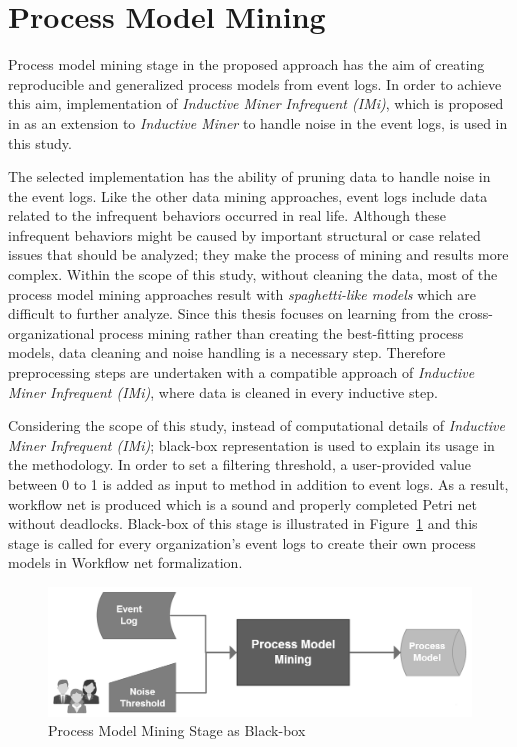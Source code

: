 \section{Process Model Mining}
\label{sec:process-model-mining}
Process model mining stage in the proposed approach has the aim of creating reproducible and generalized process models from event logs. In order to achieve this aim, implementation of \textit{Inductive Miner Infrequent (IMi)}, which is proposed in \cite{leemans2014discoveringinfrequent} as an extension to \textit{Inductive Miner} to handle noise in the event logs, is used in this study. 

The selected implementation has the ability of pruning data to handle noise in the event logs. Like the other data mining approaches, event logs include data related to the infrequent behaviors occurred in real life. Although these infrequent behaviors might be caused by important structural or case related issues that should be analyzed; they make the process of mining and results more complex. Within the scope of this study, without cleaning the data, most of the process model mining approaches result with \textit{spaghetti-like models} \cite{van2011process} which are difficult to further analyze. Since this thesis focuses on learning from the cross-organizational process mining rather than creating the best-fitting process models, data cleaning and noise handling is a necessary step. Therefore preprocessing steps are undertaken with a compatible approach of \textit{Inductive Miner Infrequent (IMi)}, where data is cleaned in every inductive step.

Considering the scope of this study, instead of computational details of \textit{Inductive Miner Infrequent (IMi)}; black-box representation is used to explain its usage in the methodology. In order to set a filtering threshold, a user-provided value between 0 to 1 is added as input to method in addition to event logs. As a result, workflow net is produced which is a sound and properly completed Petri net without deadlocks. Black-box of this stage is illustrated in Figure~\ref{fig:process-model-mining-blackbox} and this stage is called for every organization's event logs to create their own process models in Workflow net formalization.

\begin{figure}
  \centering
  \includegraphics[width=\textwidth]{4_methodology/process-model-mining-blackbox}
  \caption{Process Model Mining Stage as Black-box }
  \label{fig:process-model-mining-blackbox}
\end{figure}


